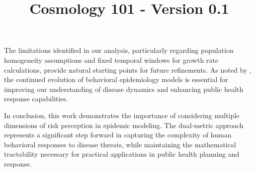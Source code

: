 \documentclass{article}\usepackage{graphicx} \usepackage{amsmath} \usepackage{colortbl}\title{Cosmology 101 - Version 0.1}
\begin{document}
The limitations identified in our analysis, particularly regarding population homogeneity assumptions and fixed temporal windows for growth rate calculations, provide natural starting points for future refinements. As noted by \cite{hethcote2000mathematics}, the continued evolution of behavioral epidemiology models is essential for improving our understanding of disease dynamics and enhancing public health response capabilities.

In conclusion, this work demonstrates the importance of considering multiple dimensions of risk perception in epidemic modeling. The dual-metric approach represents a significant step forward in capturing the complexity of human behavioral responses to disease threats, while maintaining the mathematical tractability necessary for practical applications in public health planning and response.
\end{document}

